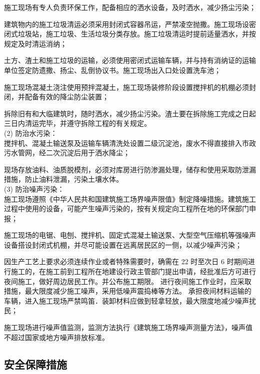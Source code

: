  施工现场有专人负责环保工作，配备相应的洒水设备，及时洒水，减少扬尘污染；  

 建筑物内的施工垃圾清运必须采用封闭式容器吊运，严禁凌空抛撒。施工现场设密闭式垃圾站，施工垃圾、生活垃圾分类存放。施工垃圾清运时提前适量洒水，并按规定及时清运消纳；  

 土方、渣土和施工垃圾的运输，必须使用密闭式运输车辆，并与持有消纳证的运输单位签定防遗撒、扬尘、乱倒协议书。施工现场出入口处设置洗车池； 

 施工现场混凝土浇注使用预拌混凝土，施工现场装修阶段设置搅拌机的机棚必须封闭，并配备有效的降尘防尘装置；  

 拆除旧有和大临建筑时，随时洒水，减少扬尘污染。渣土要在拆除施工完成之日起三日内清运完毕，并遵守拆除工程的有关规定。  \\

(2) 防治水污染：\\

 搅拌机、混凝土输送泵及运输车辆清洗处设置二级沉淀池，废水不得直接排入市政污水管网，经二次沉淀后用于洒水降尘；

 现场存放油料、油质脱模剂，必须对库房进行防渗漏处理，储存和使用采取防泄漏措施，防止油料泄漏，污染土壤水体。\\

(3) 防治噪声污染：\\

 施工现场遵照《中华人民共和国建筑施工场界噪声限值》制定降噪措施。建筑施工过程中使用的设备，可能产生噪声污染的，按有关规定向工程所在地的环保部门申报；

 施工现场的电锯、电刨、搅拌机、固定式混凝土输送泵、大型空气压缩机等强噪声设备搭设封闭式机棚，并尽可能设置在远离居民区的一侧，以减少噪声污染；  

 因生产工艺上要求必须连续作业或者特殊需要时，确需在 22 时至次日 6 时期间进行施工的，在施工前到工程所在地建设行政主管部门提出申请，经批准后方可进行夜间施工，做好周边居民工作。并公布施工期限。  进行夜间施工作业时，应采取措施，最大限度减少施工噪声，采用低噪声震捣棒等方法。
承担夜间材料运输的车辆，进入施工现场严禁鸣笛．装卸材料应做到轻拿轻放，最大限度地减少噪声扰民；  

 施工现场进行噪声值监测，监测方法执行《建筑施工场界噪声测量方法》，噪声值不超过国家或地方噪声排放标准。  

\subsection{安全保障措施}
